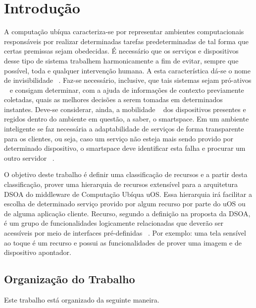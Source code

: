 \chapter{Introdução}

A computação ubíqua caracteriza-se por representar ambientes computacionais responsáveis por realizar determinadas tarefas predeterminadas de tal forma que certas premissas sejam obedecidas. É necessário que os serviços e dispositivos desse tipo de sistema trabalhem harmonicamente a fim de evitar, sempre que possível, toda e qualquer intervenção humana. A esta característica dá-se o nome de invisibilidade ~\cite{gomes2007, weiser1993, weiser1999}. Faz-se necessário, inclusive, que tais sistemas sejam pró-ativos ~\cite{gomes2007, buzeto2010} e consigam determinar, com a ajuda de informações de contexto previamente coletadas, quais as melhores decisões a serem tomadas em determinados instantes. Deve-se considerar, ainda, a mobilidade ~\cite{gomes2007, buzeto2010, weiser1999} dos dispositivos presentes e regidos dentro do ambiente em questão, a saber, o smartspace. Em um ambiente inteligente se faz necessária a adaptabilidade de serviços de forma transparente para os clientes, ou seja, caso um serviço não esteja mais sendo provido por determinado dispositivo, o smartspace deve identificar esta falha e procurar um outro servidor ~\cite{gomes2007, passarinho2008, paranhos2009}.

O objetivo deste trabalho é definir uma classificação de recursos e a partir desta classificação, prover uma hierarquia de recursos extensível para a arquitetura DSOA do middleware de Computação Ubíqua uOS. Essa hierarquia irá facilitar a escolha de determinado serviço provido por algum recurso por parte do uOS ou de alguma aplicação cliente. Recurso, segundo a definição na proposta da DSOA, é um grupo de funcionalidades logicamente relacionadas que deverão ser acessíveis por meio de interfaces pré-definidas ~\cite{buzeto2010}. Por exemplo: uma tela sensível ao toque é um recurso e possui as funcionalidades de prover uma imagem e de dispositivo apontador.

\section{Organização do Trabalho}
Este trabalho está organizado da seguinte maneira.


